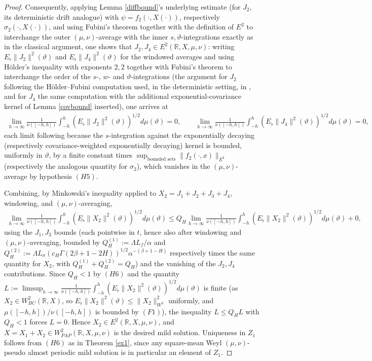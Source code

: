 \documentclass[11pt]{amsart}
\begin{document}
\begin{proof}
Consequently, applying Lemma \ref{diffbound}'s underlying estimate (for $J_2$, its deterministic drift analogue) with $\psi=f_2(\cdot,X(\cdot))$, respectively $\sigma_2(\cdot,X(\cdot))$, and using Fubini's theorem together with the definition of $E^2$ to interchange the outer $(\mu,\nu)$-average with the inner $s,\vartheta$-integrations exactly as in the classical argument, one shows that $J_2,J_4\in E^2(\mathbb R,X,\mu,\nu)$: writing $E_\flat\|J_2\|^2(\vartheta)$ and $E_\flat\|J_4\|^2(\vartheta)$ for the windowed averages and using H\"older's inequality with exponents $2,2$ together with Fubini's theorem to interchange the order of the $s$-, $w$- and $\vartheta$-integrations (the argument for $J_2$ following the H\"older--Fubini computation used, in the deterministic setting, in \cite[Theorem 4.3]{LiWeyl}, and for $J_4$ the same computation with the additional exponential-covariance kernel of Lemma \ref{covbound} inserted), one arrives at
\begin{align*}
\lim_{h\to\infty}\frac1{\nu([-h,h])}\int_{-h}^h\left(E_\flat\|J_2\|^2(\vartheta)\right)^{1/2}d\mu(\vartheta)=0,\qquad
\lim_{h\to\infty}\frac1{\nu([-h,h])}\int_{-h}^h\left(E_\flat\|J_4\|^2(\vartheta)\right)^{1/2}d\mu(\vartheta)=0,
\end{align*}
each limit following because the $s$-integration against the exponentially decaying (respectively covariance-weighted exponentially decaying) kernel is bounded, uniformly in $\vartheta$, by a finite constant times $\sup_{\text{bounded sets}}\|f_2(\cdot,x)\|_{E^2}$ (respectively the analogous quantity for $\sigma_2$), which vanishes in the $(\mu,\nu)$-average by hypothesis $(H5)$.

Combining, by Minkowski's inequality applied to $X_2=J_1+J_2+J_3+J_4$, windowing, and $(\mu,\nu)$-averaging,
\begin{align*}
\lim_{h\to\infty}\frac1{\nu([-h,h])}\int_{-h}^h\left(E_\flat\|X_2\|^2(\vartheta)\right)^{1/2}d\mu(\vartheta)
\le Q_H\lim_{h\to\infty}\frac1{\nu([-h,h])}\int_{-h}^h\left(E_\flat\|X_2\|^2(\vartheta)\right)^{1/2}d\mu(\vartheta)+0,
\end{align*}
using the $J_1,J_3$ bounds (each pointwise in $t$, hence also after windowing and $(\mu,\nu)$-averaging, bounded by $Q_H^{(1)}:=\Lambda L_f/\alpha$ and $Q_H^{(2)}:=\Lambda L_\sigma(c_H\Gamma(2\beta+1-2H))^{1/2}\alpha^{-(\beta+1-H)}$ respectively times the same quantity for $X_2$, with $Q_H^{(1)}+Q_H^{(2)}=Q_H$) and the vanishing of the $J_2,J_4$ contributions. Since $Q_H<1$ by $(H6)$ and the quantity $L:=\limsup_{h\to\infty}\frac1{\nu([-h,h])}\int_{-h}^h(E_\flat\|X_2\|^2(\vartheta))^{1/2}d\mu(\vartheta)$ is finite (as $X_2\in W^2_{BC}(\mathbb R,X)$, so $E_\flat\|X_2\|^2(\vartheta)\le\|X_2\|^2_{W^2}$ uniformly, and $\mu([-h,h])/\nu([-h,h])$ is bounded by $(F1)$), the inequality $L\le Q_HL$ with $Q_H<1$ forces $L=0$. Hence $X_2\in E^2(\mathbb R,X,\mu,\nu)$, and $X=X_1+X_2\in W^2_{PAP}(\mathbb R,X,\mu,\nu)$ is the desired mild solution. Uniqueness in $Z_1$ follows from $(H6)$ as in Theorem \ref{ex1}, since any square-mean Weyl $(\mu,\nu)$-pseudo almost periodic mild solution is in particular an element of $Z_1$.
\end{proof}
\end{document}
